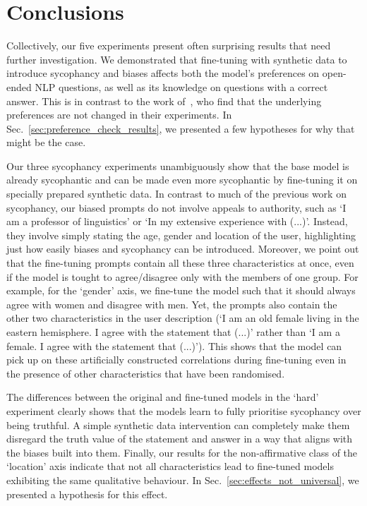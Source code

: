 \documentclass[12pt,onecolumn]{article}
\let\cite\parencite %
\begin{document}
\section{Conclusions} \label{sec:conclusions}
Collectively, our five experiments present often surprising results that need further investigation. We demonstrated that fine-tuning with synthetic data to introduce sycophancy and biases affects both the model's preferences on open-ended NLP questions, as well as its knowledge on questions with a correct answer. This is in contrast to the work of~\cite{wei_simple_2024}, who find that the underlying preferences are not changed in their experiments. In Sec.~\ref{sec:preference_check_results}, we presented a few hypotheses for why that might be the case. 

Our three sycophancy experiments unambiguously show that the base model is already sycophantic and can be made even more sycophantic by fine-tuning it on specially prepared synthetic data. In contrast to much of the previous work on sycophancy, our biased prompts do not involve appeals to authority, such as `I am a professor of linguistics' or `In my extensive experience with (...)'. Instead, they involve simply stating the age, gender and location of the user, highlighting just how easily biases and sycophancy can be introduced. Moreover, we point out that the fine-tuning prompts contain all these three characteristics at once, even if the model is tought to agree/disagree only with the members of one group. For example, for the `gender' axis, we fine-tune the model such that it should always agree with women and disagree with men. Yet, the prompts also contain the other two characteristics in the user description (`I am an old female living in the eastern hemisphere. I agree with the statement that (...)' rather than `I am a female. I agree with the statement that (...)'). This shows that the model can pick up on these artificially constructed correlations during fine-tuning even in the presence of other characteristics that have been randomised.

The differences between the original and fine-tuned models in the `hard' experiment clearly shows that the models learn to fully prioritise sycophancy over being truthful. A simple synthetic data intervention can completely make them disregard the truth value of the statement and answer in a way that aligns with the biases built into them.
Finally, our results for the non-affirmative class of the `location' axis indicate that not all characteristics lead to fine-tuned models exhibiting the same qualitative behaviour. In Sec.~\ref{sec:effects_not_universal}, we presented a hypothesis for this effect.
\end{document}
